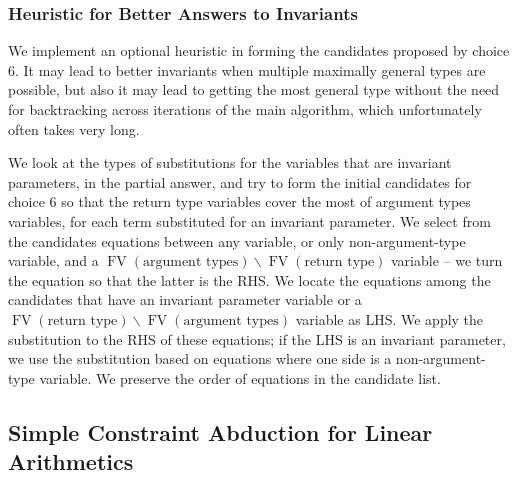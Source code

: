 \documentclass{article}
\newcommand{\tmop}[1]{\ensuremath{\operatorname{#1}}}
\begin{document}
\subsubsection{Heuristic for Better Answers to Invariants}

We implement an optional heuristic in forming the candidates proposed by
choice 6. It may lead to better invariants when multiple maximally general
types are possible, but also it may lead to getting the most general type
without the need for backtracking across iterations of the main algorithm,
which unfortunately often takes very long.

We look at the types of substitutions for the variables that are invariant
parameters, in the partial answer, and try to form the initial candidates for
choice 6 so that the return type variables cover the most of argument types
variables, for each term substituted for an invariant parameter. We select
from the candidates equations between any variable, or only non-argument-type
variable, and a $\tmop{FV} (\text{argument types}) \backslash \tmop{FV}
(\text{return type})$ variable -- we turn the equation so that the latter is
the RHS. We locate the equations among the candidates that have an invariant
parameter variable or a $\tmop{FV} (\text{return type}) \backslash \tmop{FV}
(\text{argument types})$ variable as LHS. We apply the substitution to the RHS
of these equations; if the LHS is an invariant parameter, we use the
substitution based on equations where one side is a non-argument-type
variable. We preserve the order of equations in the candidate list.

\subsection{Simple Constraint Abduction for Linear
Arithmetics}\label{SCANumAlg}
\end{document}
